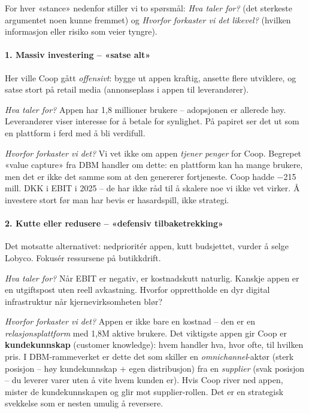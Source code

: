 For hver «stance» nedenfor stiller vi to spørsmål: \emph{Hva taler for?}
(det sterkeste argumentet noen kunne fremmet) og \emph{Hvorfor forkaster
vi det likevel?} (hvilken informasjon eller risiko som veier tyngre).

\paragraph{1. Massiv investering -- «satse alt»}
Her ville Coop gått \emph{offensivt}: bygge ut appen kraftig, ansette
flere utviklere, og satse stort på retail media (annonseplass i appen
til leverandører).

\emph{Hva taler for?} Appen har 1{,}8 millioner brukere -- adopsjonen er
allerede høy. Leverandører viser interesse for å betale for synlighet.
På papiret ser det ut som en plattform i ferd med å bli verdifull.

\emph{Hvorfor forkaster vi det?} Vi vet ikke om appen \emph{tjener
penger} for Coop. Begrepet «value capture» fra DBM handler om dette: en
plattform kan ha mange brukere, men det er ikke det samme som at den
genererer fortjeneste. Coop hadde $-$215 mill. DKK i EBIT i 2025 -- de
har ikke råd til å skalere noe vi ikke vet virker. Å investere stort før
man har bevis er hasardspill, ikke strategi.

\paragraph{2. Kutte eller redusere -- «defensiv tilbaketrekking»}
Det motsatte alternativet: nedprioritér appen, kutt budsjettet, vurder å
selge Lobyco. Fokusér ressursene på butikkdrift.

\emph{Hva taler for?} Når EBIT er negativ, er kostnadskutt naturlig.
Kanskje appen er en utgiftspost uten reell avkastning. Hvorfor
opprettholde en dyr digital infrastruktur når kjernevirksomheten
blør?

\emph{Hvorfor forkaster vi det?} Appen er ikke bare en kostnad -- den er
en \emph{relasjonsplattform} med 1{,}8M aktive brukere. Det viktigste
appen gir Coop er \textbf{kundekunnskap} (customer knowledge): hvem
handler hva, hvor ofte, til hvilken pris. I DBM-rammeverket er dette
det som skiller en \emph{omnichannel}-aktør (sterk posisjon -- høy
kundekunnskap + egen distribusjon) fra en \emph{supplier} (svak posisjon
-- du leverer varer uten å vite hvem kunden er). Hvis Coop river ned
appen, mister de kundekunnskapen og glir mot supplier-rollen. Det er en
strategisk svekkelse som er nesten umulig å reversere.

